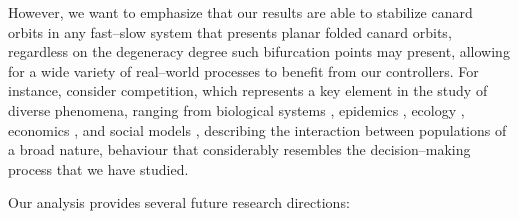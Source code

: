 \documentclass[3p]{elsarticle}
\theoremstyle{plain}
\theoremstyle{remark}
\theoremstyle{definition}
\begin{document}
     However, we want to emphasize that our results are able to stabilize canard orbits in any fast--slow system that presents planar folded canard orbits, regardless on the degeneracy degree such bifurcation points may present, allowing for a wide variety of real--world processes to benefit from our controllers. For instance, consider competition, which represents a key element in the study of diverse phenomena, ranging from biological systems \cite{Ref:Abrams2022}, epidemics \cite{Ref:Ye2022}, ecology \cite{Ref:Zeppini2020, Ref:Chen2021}, economics \cite{Ref:Asano2021, Ref:Yao2022}, and social models \cite{Ref:Bravetti2018}, describing the interaction between populations of a broad nature, behaviour that considerably resembles the decision--making process that we have studied.
     
Our analysis provides several future research directions:
\end{document}
